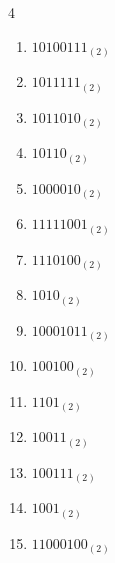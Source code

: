 \begin{multicols}{4}
\begin{enumerate}
        \phantom{$=219$}

  \item $10100111_{(2)}$

        \phantom{$=167$}

\columnbreak %

  \item $1011111_{(2)}$

        \phantom{$=95$}

  \item $1011010_{(2)}$

        \phantom{$=90$}

  \item $10110_{(2)}$

        \phantom{$=22$}

  \item $1000010_{(2)}$

        \phantom{$=66$}

  \item $11111001_{(2)}$

        \phantom{$=249$}

  \item $1110100_{(2)}$

        \phantom{$=116$}

  \item $1010_{(2)}$

        \phantom{$=10$}

  \item $10001011_{(2)}$

        \phantom{$=139$}

  \item $100100_{(2)}$

        \phantom{$=36$}

  \item $1101_{(2)}$

        \phantom{$=13$}

  \item $10011_{(2)}$

        \phantom{$=19$}

  \item $100111_{(2)}$

        \phantom{$=39$}

  \item $1001_{(2)}$

        \phantom{$=9$}

  \item $11000100_{(2)}$


\end{enumerate}
\end{multicols}
